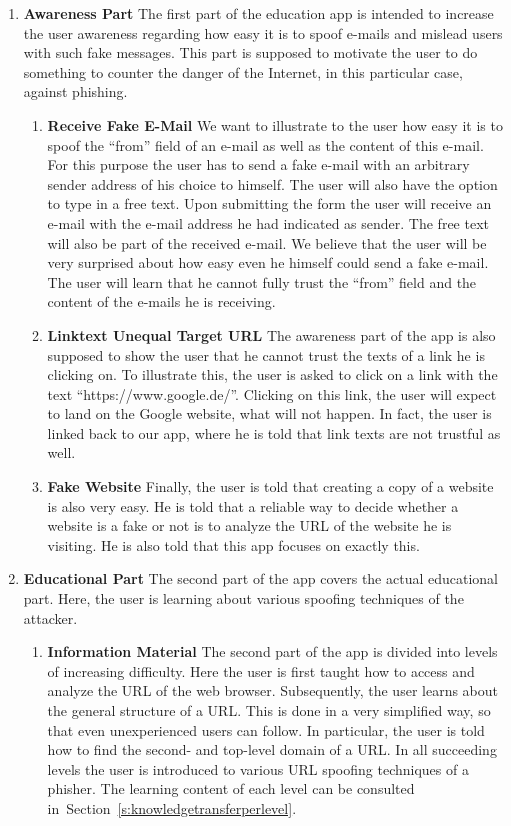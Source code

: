 \begin{enumerate}
	\item \textbf{Awareness Part} The first part of the education app is intended to increase the user awareness regarding how easy it is to spoof e-mails and mislead users with such fake messages. This part is supposed to motivate the user to do something to counter the danger of the Internet, in this particular case, against phishing.
	\begin{enumerate}
		\item \textbf{Receive Fake E-Mail} We want to illustrate to the user how easy it is to spoof the ``from'' field of an e-mail as well as the content of this e-mail. For this purpose the user has to send a fake e-mail with an arbitrary sender address of his choice to himself. The user will also have the option to type in a free text. Upon submitting the form the user will receive an e-mail with the e-mail address he had indicated as sender. The free text will also be part of the received e-mail. We believe that the user will be very surprised about how easy even he himself could send a fake e-mail. The user will learn that he cannot fully trust the ``from'' field and the content of the e-mails he is receiving.
		\item \textbf{Linktext Unequal Target URL} The awareness part of the app is also supposed to show the user that he cannot trust the texts of a link he is clicking on. To illustrate this, the user is asked to click on a link with the text ``https://www.google.de/''. Clicking on this link, the user will expect to land on the Google website, what will not happen. In fact, the user is linked back to our app, where he is told that link texts are not trustful as well. 
	\item \textbf{Fake Website} Finally, the user is told that creating a copy of a website is also very easy. He is told that a reliable way to decide whether a website is a fake or not is to analyze the URL of the website he is visiting. He is also told that this app focuses on exactly this.
	\end{enumerate}
	\item \textbf{Educational Part} The second part of the app covers the actual educational part. Here, the user is learning about various spoofing techniques of the attacker.
	\begin{enumerate}
		\item \textbf{Information Material} The second part of the app is divided into levels of increasing difficulty. Here the user is first taught how to access and analyze the URL of the web browser. Subsequently, the user learns about the general structure of a URL. This is done in a very simplified way, so that even unexperienced users can follow. In particular, the user is told how to find the second- and top-level domain of a URL. In all succeeding levels the user is introduced to various URL spoofing techniques of a phisher. The learning content of each level can be consulted in~Section~\ref{s:knowledgetransferperlevel}.

\end{enumerate}
\end{enumerate}
